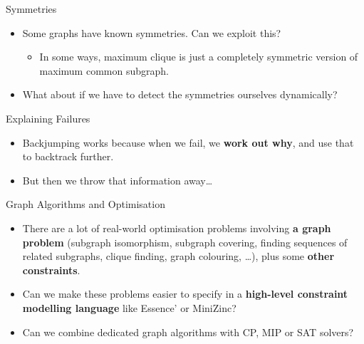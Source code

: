 \documentclass{beamer}
\begin{document}
\begin{frame}{Symmetries}

    \begin{itemize}
        \item Some graphs have known symmetries. Can we exploit this?

            \begin{itemize}
                \item In some ways, maximum clique is just a completely symmetric version of maximum
                    common subgraph.
            \end{itemize}

        \item What about if we have to detect the symmetries ourselves dynamically?
    \end{itemize}

\end{frame}

\begin{frame}{Explaining Failures}

    \begin{itemize}
        \item Backjumping works because when we fail, we \textbf{work out why},
            and use that to backtrack further.

        \item But then we throw that information away\ldots
    \end{itemize}

\end{frame}

\begin{frame}{Graph Algorithms and Optimisation}

    \begin{itemize}
        \item There are a lot of real-world optimisation problems involving \textbf{a
            graph problem} (subgraph isomorphism, subgraph covering, finding
            sequences of related subgraphs, clique finding, graph colouring,
            \ldots), plus some \textbf{other constraints}.

        \item Can we make these problems easier to specify in a
            \textbf{high-level constraint modelling language} like Essence' or
            MiniZinc?

        \item Can we combine dedicated graph algorithms with CP, MIP or SAT
            solvers?
    \end{itemize}

\end{frame}
\end{document}
